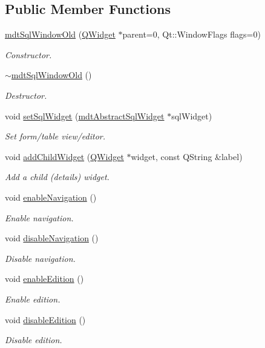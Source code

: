 \subsection*{Public Member Functions}
\begin{DoxyCompactItemize}
\item 
\hyperlink{classmdt_sql_window_old_a9170407405ec35a04db91de7d0e7ba25}{mdt\-Sql\-Window\-Old} (\hyperlink{class_q_widget}{Q\-Widget} $\ast$parent=0, Qt\-::\-Window\-Flags flags=0)
\begin{DoxyCompactList}\small\item\em Constructor. \end{DoxyCompactList}\item 
\hyperlink{classmdt_sql_window_old_ab83d51a38de33e200d40d1e25c870529}{$\sim$mdt\-Sql\-Window\-Old} ()
\begin{DoxyCompactList}\small\item\em Destructor. \end{DoxyCompactList}\item 
void \hyperlink{classmdt_sql_window_old_aa77972aa139311b6ba5c717873afd2a5}{set\-Sql\-Widget} (\hyperlink{classmdt_abstract_sql_widget}{mdt\-Abstract\-Sql\-Widget} $\ast$sql\-Widget)
\begin{DoxyCompactList}\small\item\em Set form/table view/editor. \end{DoxyCompactList}\item 
void \hyperlink{classmdt_sql_window_old_a4638d6ecc9ac7bc9af922c623d412846}{add\-Child\-Widget} (\hyperlink{class_q_widget}{Q\-Widget} $\ast$widget, const Q\-String \&label)
\begin{DoxyCompactList}\small\item\em Add a child (details) widget. \end{DoxyCompactList}\item 
void \hyperlink{classmdt_sql_window_old_a270a09e3a2a370320bfbcc844b02cddc}{enable\-Navigation} ()
\begin{DoxyCompactList}\small\item\em Enable navigation. \end{DoxyCompactList}\item 
void \hyperlink{classmdt_sql_window_old_a5c1dd39dcead4e1f44e7c59c567caaeb}{disable\-Navigation} ()
\begin{DoxyCompactList}\small\item\em Disable navigation. \end{DoxyCompactList}\item 
void \hyperlink{classmdt_sql_window_old_a6bca9d2b8f8250baaa97f70c0974edf4}{enable\-Edition} ()
\begin{DoxyCompactList}\small\item\em Enable edition. \end{DoxyCompactList}\item 
void \hyperlink{classmdt_sql_window_old_a2945fb8061c851907d422e0c847148da}{disable\-Edition} ()
\begin{DoxyCompactList}\small\item\em Disable edition. \end{DoxyCompactList}\end{DoxyCompactItemize}
